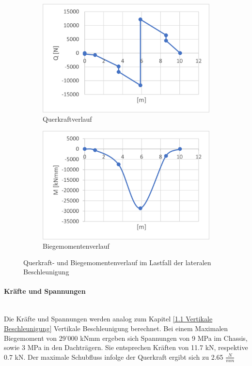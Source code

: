   \begin{figure}[!ht]
    \centering
      \begin{subfigure}{.5\textwidth}
        \centering
        \includegraphics[width=.98\linewidth]{04_figures/1.4 Q.png}
        \caption{Querkraftverlauf}
        \label{1.4 Q}
      \end{subfigure}%
      \begin{subfigure}{.5\textwidth}
        \centering
        \includegraphics[width=.98\linewidth]{04_figures/1.4 M.png}
        \caption{Biegemomentenverlauf}
        \label{1.4 M}
      \end{subfigure}%
    \caption{Querkraft- und Biegemomentenverlauf im Lastfall der lateralen Beschleunigung}
  \label{1.4 QM}
  \end{figure}

  \paragraph{Kräfte und Spannungen}\mbox{}\\
  Die Kräfte und Spannungen werden analog zum Kapitel \ref{1.1 Vertikale Beschleunigung} Vertikale Beschleunigung berechnet. Bei einem Maximalen Biegemoment von 29'000 kNmm ergeben sich Spannungen von 9 MPa im Chassis, sowie 3 MPa in den Dachträgern. Sie entsprechen Kräften von 11.7 kN, respektive 0.7 kN. Der maximale Schubfluss infolge der Querkraft ergibt sich zu 2.65 $\frac{N}{mm}$

